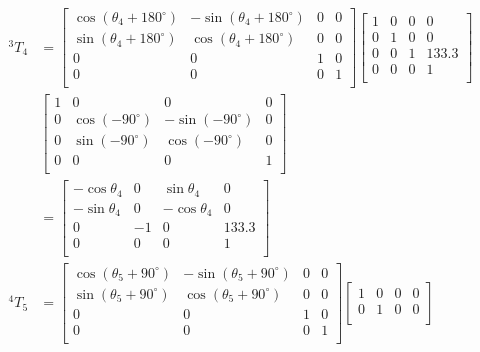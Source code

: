 \documentclass[UTF8, 12pt]{ctexart}
\begin{document}
\[
\begin{aligned}
{}^3T_4 &= \begin{bmatrix}
        \cos(\theta_4 + 180^\circ) & -\sin(\theta_4 + 180^\circ) & 0 & 0 \\
        \sin(\theta_4 + 180^\circ) & \cos(\theta_4 + 180^\circ) & 0 & 0 \\
        0 & 0 & 1 & 0 \\
        0 & 0 & 0 & 1 \\
        \end{bmatrix}
        \begin{bmatrix}
        1 & 0 & 0 & 0 \\
        0 & 1 & 0 & 0 \\
        0 & 0 & 1 & 133.3 \\
        0 & 0 & 0 & 1 \\
        \end{bmatrix} \\
        &\begin{bmatrix}
        1 & 0 & 0 & 0 \\
        0 & \cos(-90^\circ) & -\sin(-90^\circ) & 0 \\
        0 & \sin(-90^\circ) & \cos(-90^\circ) & 0 \\
        0 & 0 & 0 & 1 \\
        \end{bmatrix} \\
        &= \begin{bmatrix}
        -\cos\theta_4 & 0 & \sin\theta_4 & 0 \\
        -\sin\theta_4 & 0 & -\cos\theta_4 & 0 \\
        0 & -1 & 0 & 133.3 \\
        0 & 0 & 0 & 1 \\
        \end{bmatrix} \\
{}^4T_5 &= \begin{bmatrix}
        \cos(\theta_5 + 90^\circ) & -\sin(\theta_5 + 90^\circ) & 0 & 0 \\
        \sin(\theta_5 + 90^\circ) & \cos(\theta_5 + 90^\circ) & 0 & 0 \\
        0 & 0 & 1 & 0 \\
        0 & 0 & 0 & 1 \\
        \end{bmatrix}
        \begin{bmatrix}
        1 & 0 & 0 & 0 \\
        0 & 1 & 0 & 0 \\

\end{bmatrix}
\end{aligned}\]
\end{document}
